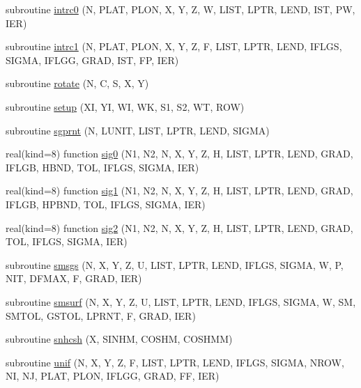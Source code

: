 \begin{DoxyCompactItemize}
\item 
subroutine \hyperlink{ssrfpack_8f_a347c75fb6a5533d28f208049a6b8b9df}{intrc0} (N, P\+L\+A\+T, P\+L\+O\+N, X, Y, Z, W, L\+I\+S\+T, L\+P\+T\+R, L\+E\+N\+D, I\+S\+T, P\+W, I\+E\+R)
\item 
subroutine \hyperlink{ssrfpack_8f_aa8e7466a7f7559b6150bbe2c19967b16}{intrc1} (N, P\+L\+A\+T, P\+L\+O\+N, X, Y, Z, F, L\+I\+S\+T, L\+P\+T\+R, L\+E\+N\+D, I\+F\+L\+G\+S, S\+I\+G\+M\+A, I\+F\+L\+G\+G, G\+R\+A\+D, I\+S\+T, F\+P, I\+E\+R)
\item 
subroutine \hyperlink{ssrfpack_8f_a320320a847275dbab4d0049e94772364}{rotate} (N, C, S, X, Y)
\item 
subroutine \hyperlink{ssrfpack_8f_aa76325c7e9c8f92bd7260245aeb1b8a1}{setup} (X\+I, Y\+I, W\+I, W\+K, S1, S2, W\+T, R\+O\+W)
\item 
subroutine \hyperlink{ssrfpack_8f_a3e1f75d113af677f02865437d7c2d58b}{sgprnt} (N, L\+U\+N\+I\+T, L\+I\+S\+T, L\+P\+T\+R, L\+E\+N\+D, S\+I\+G\+M\+A)
\item 
real(kind=8) function \hyperlink{ssrfpack_8f_a2de759653fe7b41789705813e8c6cce8}{sig0} (N1, N2, N, X, Y, Z, H, L\+I\+S\+T, L\+P\+T\+R, L\+E\+N\+D, G\+R\+A\+D, I\+F\+L\+G\+B, H\+B\+N\+D, T\+O\+L, I\+F\+L\+G\+S, S\+I\+G\+M\+A, I\+E\+R)
\item 
real(kind=8) function \hyperlink{ssrfpack_8f_adc80f9fac0f9a7a8509094a3dcf7dba9}{sig1} (N1, N2, N, X, Y, Z, H, L\+I\+S\+T, L\+P\+T\+R, L\+E\+N\+D, G\+R\+A\+D, I\+F\+L\+G\+B, H\+P\+B\+N\+D, T\+O\+L, I\+F\+L\+G\+S, S\+I\+G\+M\+A, I\+E\+R)
\item 
real(kind=8) function \hyperlink{ssrfpack_8f_a58ec66bca9583e579ffa3a3312d9dd9f}{sig2} (N1, N2, N, X, Y, Z, H, L\+I\+S\+T, L\+P\+T\+R, L\+E\+N\+D, G\+R\+A\+D, T\+O\+L, I\+F\+L\+G\+S, S\+I\+G\+M\+A, I\+E\+R)
\item 
subroutine \hyperlink{ssrfpack_8f_ad3518f9cb2353207b0563724003e595d}{smsgs} (N, X, Y, Z, U, L\+I\+S\+T, L\+P\+T\+R, L\+E\+N\+D, I\+F\+L\+G\+S, S\+I\+G\+M\+A, W, P, N\+I\+T, D\+F\+M\+A\+X, F, G\+R\+A\+D, I\+E\+R)
\item 
subroutine \hyperlink{ssrfpack_8f_adffd665ec153b2a42e485618e110dc97}{smsurf} (N, X, Y, Z, U, L\+I\+S\+T, L\+P\+T\+R, L\+E\+N\+D, I\+F\+L\+G\+S, S\+I\+G\+M\+A, W, S\+M, S\+M\+T\+O\+L, G\+S\+T\+O\+L, L\+P\+R\+N\+T, F, G\+R\+A\+D, I\+E\+R)
\item 
subroutine \hyperlink{ssrfpack_8f_ab50c1a1c28a6c038677ae85439b3c8d8}{snhcsh} (X, S\+I\+N\+H\+M, C\+O\+S\+H\+M, C\+O\+S\+H\+M\+M)
\item 
subroutine \hyperlink{ssrfpack_8f_a32bbda3cba4354ae5d4859ece33f4827}{unif} (N, X, Y, Z, F, L\+I\+S\+T, L\+P\+T\+R, L\+E\+N\+D, I\+F\+L\+G\+S, S\+I\+G\+M\+A, N\+R\+O\+W, N\+I, N\+J, P\+L\+A\+T, P\+L\+O\+N, I\+F\+L\+G\+G, G\+R\+A\+D, F\+F, I\+E\+R)
\end{DoxyCompactItemize}


